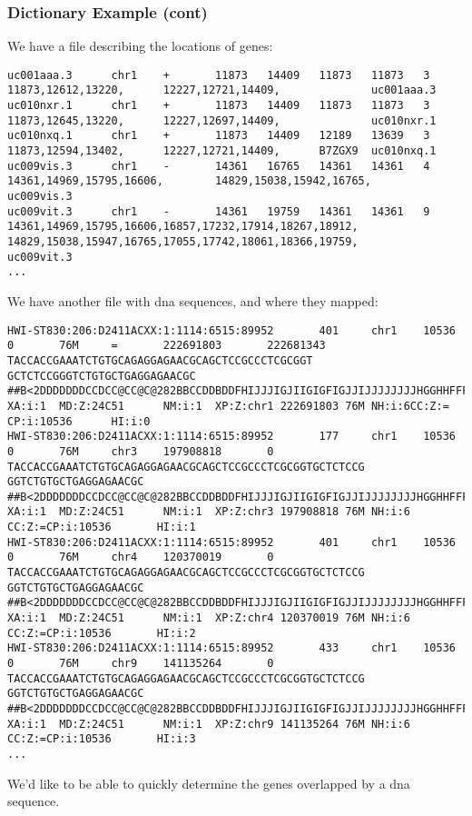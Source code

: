 \documentclass[10pt]{beamer}
\newcommand\tinyfont{\fontsize{4pt}{7.2}\selectfont}
\newcommand\regfont{\fontsize{10pt}{7.2}\selectfont}
\begin{document}
\begin{frame}[fragile]
\frametitle{Dictionary Example (cont)}

We have a file describing the locations of genes:

\tinyfont
\begin{verbatim}
uc001aaa.3      chr1    +       11873   14409   11873   11873   3       11873,12612,13220,      12227,12721,14409,              uc001aaa.3
uc010nxr.1      chr1    +       11873   14409   11873   11873   3       11873,12645,13220,      12227,12697,14409,              uc010nxr.1
uc010nxq.1      chr1    +       11873   14409   12189   13639   3       11873,12594,13402,      12227,12721,14409,      B7ZGX9  uc010nxq.1
uc009vis.3      chr1    -       14361   16765   14361   14361   4       14361,14969,15795,16606,        14829,15038,15942,16765,                uc009vis.3
uc009vit.3      chr1    -       14361   19759   14361   14361   9       14361,14969,15795,16606,16857,17232,17914,18267,18912,  14829,15038,15947,16765,17055,17742,18061,18366,19759,          uc009vit.3
...
\end{verbatim}

\regfont
We have another file with dna sequences, and where they mapped:

\tinyfont
\begin{verbatim}
HWI-ST830:206:D2411ACXX:1:1114:6515:89952       401     chr1    10536   0       76M     =       222691803       222681343       TACCACCGAAATCTGTGCAGAGGAGAACGCAGCTCCGCCCTCGCGGT
GCTCTCCGGGTCTGTGCTGAGGAGAACGC   ##B<2DDDDDDDCCDCC@CC@C@282BBCCDDBDDFHIJJJIGJIIGIGFIGJJIJJJJJJJJHGGHHFFFFDCC@    XA:i:1  MD:Z:24C51      NM:i:1  XP:Z:chr1 222691803 76M NH:i:6CC:Z:=   CP:i:10536      HI:i:0
HWI-ST830:206:D2411ACXX:1:1114:6515:89952       177     chr1    10536   0       76M     chr3    197908818       0       TACCACCGAAATCTGTGCAGAGGAGAACGCAGCTCCGCCCTCGCGGTGCTCTCCG
GGTCTGTGCTGAGGAGAACGC   ##B<2DDDDDDDCCDCC@CC@C@282BBCCDDBDDFHIJJJIGJIIGIGFIGJJIJJJJJJJJHGGHHFFFFDCC@    XA:i:1  MD:Z:24C51      NM:i:1  XP:Z:chr3 197908818 76M NH:i:6  CC:Z:=CP:i:10536       HI:i:1
HWI-ST830:206:D2411ACXX:1:1114:6515:89952       401     chr1    10536   0       76M     chr4    120370019       0       TACCACCGAAATCTGTGCAGAGGAGAACGCAGCTCCGCCCTCGCGGTGCTCTCCG
GGTCTGTGCTGAGGAGAACGC   ##B<2DDDDDDDCCDCC@CC@C@282BBCCDDBDDFHIJJJIGJIIGIGFIGJJIJJJJJJJJHGGHHFFFFDCC@    XA:i:1  MD:Z:24C51      NM:i:1  XP:Z:chr4 120370019 76M NH:i:6  CC:Z:=CP:i:10536       HI:i:2
HWI-ST830:206:D2411ACXX:1:1114:6515:89952       433     chr1    10536   0       76M     chr9    141135264       0       TACCACCGAAATCTGTGCAGAGGAGAACGCAGCTCCGCCCTCGCGGTGCTCTCCG
GGTCTGTGCTGAGGAGAACGC   ##B<2DDDDDDDCCDCC@CC@C@282BBCCDDBDDFHIJJJIGJIIGIGFIGJJIJJJJJJJJHGGHHFFFFDCC@    XA:i:1  MD:Z:24C51      NM:i:1  XP:Z:chr9 141135264 76M NH:i:6  CC:Z:=CP:i:10536       HI:i:3
...
\end{verbatim}

\regfont

We'd like to be able to quickly determine the genes overlapped by a dna sequence.

\end{frame}
\end{document}
